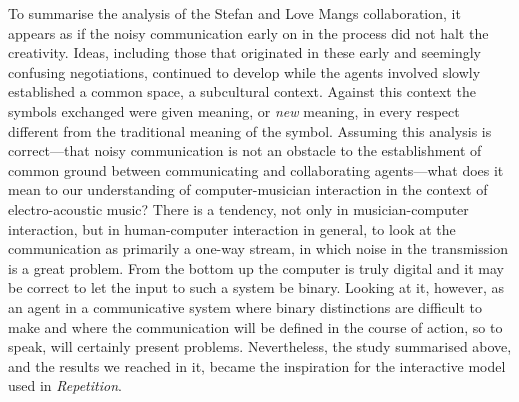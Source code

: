 \label{sec:1-par:5}
To summarise the analysis of the Stefan and Love Mangs collaboration, it appears as if the noisy communication early on in the process did not halt the creativity. Ideas, including those that originated in these early and seemingly confusing negotiations, continued to develop while the agents involved slowly established a common space, a subcultural context. Against this context the symbols exchanged were given meaning, or \emph{new} meaning, in every respect different from the traditional meaning of the symbol. Assuming this analysis is correct---that noisy communication is not an obstacle to the establishment of common ground between communicating and collaborating agents---what does it mean to our understanding of computer-musician interaction in the context of electro-acoustic music? There is a tendency, not only in musician-computer interaction, but in human-computer interaction in general, to look at the communication as primarily a one-way stream, in which noise in the transmission is a great problem. From the bottom up the computer is truly digital and it may be correct to let the input to such a system be binary. Looking at it, however, as an agent in a communicative system where binary distinctions are difficult to make and where the communication will be defined in the course of action, so to speak, will certainly present problems. Nevertheless, the study summarised above, and the results we reached in it, became the inspiration for the interactive model used in \emph{Repetition}.

